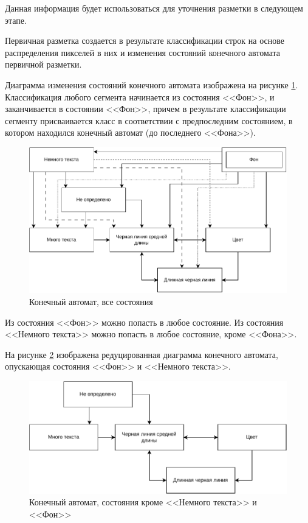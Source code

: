 Данная информация будет использоваться для уточнения разметки в следующем этапе.

Первичная разметка создается в результате классификации строк на основе распределения пикселей в них и изменения состояний конечного автомата первичной разметки.

\newpage

Диаграмма изменения состояний конечного автомата изображена на рисунке \ref{fig:fsm-full}.
Классификация любого сегмента начинается из состояния <<Фон>>, и заканчивается в состоянии <<Фон>>, причем в результате классификации сегменту присваивается класс в соответствии с предпоследним состоянием, в котором находился конечный автомат (до последнего <<Фона>>).

\begin{figure}[H]
	\centering
	\includegraphics[width=\textwidth]{diag/fsm.full.pdf}
	\caption{Конечный автомат, все состояния}
	\label{fig:fsm-full}
\end{figure}

Из состояния <<Фон>> можно попасть в любое состояние.
Из состояния <<Немного текста>> можно попасть в любое состояние, кроме <<Фона>>.

\newpage

На рисунке \ref{fig:fsm-slim} изображена редуцированная диаграмма конечного автомата, опускающая состояния <<Фон>> и <<Немного текста>>.

\begin{figure}[H]
	\centering
	\includegraphics[width=\textwidth]{diag/fsm.slim.pdf}
	\caption{Конечный автомат, состояния кроме <<Немного текста>> и <<Фон>>}
	\label{fig:fsm-slim}
\end{figure}

